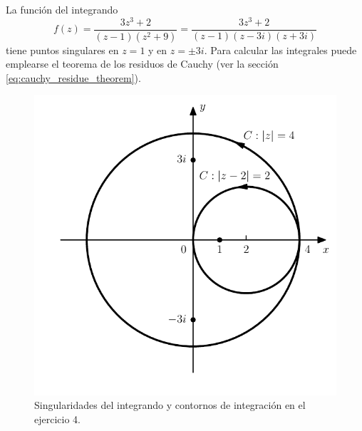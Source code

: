 \documentclass[a4paper]{report}
\begin{document}
La función del integrando 
\[
 f(z)=\frac{3z^3+2}{(z-1)(z^2+9)}=\frac{3z^3+2}{(z-1)(z-3i)(z+3i)} 
\]
tiene puntos singulares en \(z=1\) y en \(z=\pm3i\). Para calcular las integrales puede emplearse el teorema de los residuos de Cauchy (ver la sección \ref{eq:cauchy_residue_theorem}).
\begin{figure}[!htb]
  \begin{minipage}[c]{0.58\textwidth}
    \includegraphics[width=\textwidth]{figuras/exercise_81_04.pdf}
  \end{minipage}\hfill
  \begin{minipage}[c]{0.32\textwidth}
    \caption{
       Singularidades del integrando y contornos de integración en el ejercicio 4.
    }\label{fig:exercise_81_04}
  \end{minipage}
\end{figure}
\end{document}
